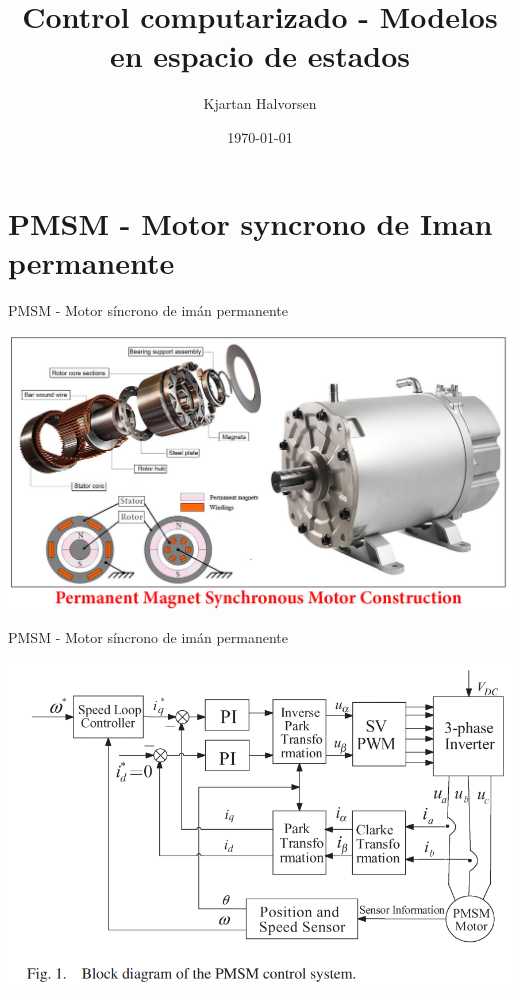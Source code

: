 \documentclass[presentation,aspectratio=1610]{beamer}
\author{Kjartan Halvorsen}
\date{\today}
\title{Control computarizado - Modelos en espacio de estados}
\begin{document}
\maketitle

\section{PMSM - Motor syncrono de Iman permanente}
\label{sec:org508c1e6}

\begin{frame}[label={sec:org4b4c1c2}]{PMSM - Motor síncrono de imán permanente}
\begin{center}
\includegraphics[width=0.9\linewidth]{../../figures/permanent-motor.jpg}
\end{center}
\end{frame}
\begin{frame}[label={sec:orga7496f7}]{PMSM - Motor síncrono de imán permanente}
\begin{center}
\includegraphics[width=0.9\linewidth]{../../figures/pmsm_control_block_diag.png}
\end{center}
\end{frame}
\end{document}
